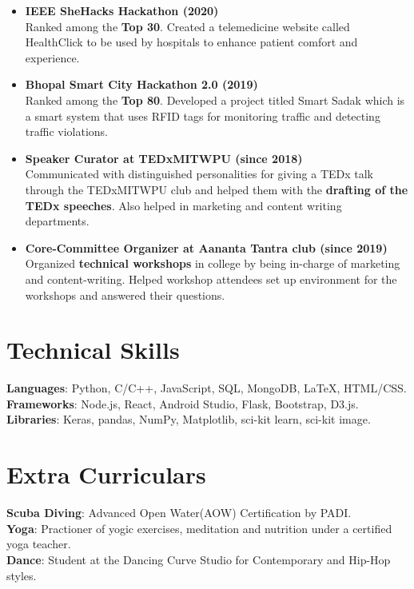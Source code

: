 \documentclass[letterpaper,11pt]{article}
\newcommand{\resumeItem}[1]{
  \item\small{
    {#1 \vspace{-2pt}}
  }
}
\newcommand{\resumeItemListStart}{\begin{itemize}}
\newcommand{\resumeItemListEnd}{\end{itemize}\vspace{-5pt}}
\begin{document}
\medskip
    \resumeItemListStart
        \resumeItem{\textbf{IEEE SheHacks Hackathon (2020)}
        \\Ranked among the \textbf{Top 30}. Created a telemedicine website called HealthClick to be used by hospitals to enhance patient comfort and experience.}
        \resumeItem{\textbf{Bhopal Smart City Hackathon 2.0 (2019)}
        \\Ranked among the \textbf{Top 80}. Developed a project titled Smart Sadak which is a smart system that uses RFID tags for monitoring traffic and detecting traffic violations.}
        \resumeItem{\textbf{Speaker Curator at TEDxMITWPU (since 2018)}
        \\Communicated with distinguished personalities for giving a TEDx talk through the TEDxMITWPU club and helped them with the \textbf{drafting of the TEDx speeches}. Also helped in marketing and content writing departments.}
        \resumeItem{\textbf{Core-Committee Organizer at Aananta Tantra club (since 2019)}
        \\Organized \textbf{technical workshops} in college by being in-charge of marketing and content-writing. Helped workshop attendees set up environment for the workshops and answered their questions.}
    \resumeItemListEnd




\section{Technical Skills}
\smallskip
 \begin{itemize}[leftmargin=0.15in, label={}]
    \small{\item{
     \textbf{Languages}{: Python, C/C++, JavaScript, SQL, MongoDB, LaTeX, HTML/CSS.} \\
     \textbf{Frameworks}{: Node.js, React, Android Studio, Flask, Bootstrap, D3.js.} \\
     \textbf{Libraries}{: Keras, pandas, NumPy, Matplotlib, sci-kit learn, sci-kit image.}
    }}
 \end{itemize}

\section{Extra Curriculars}
\smallskip
\begin{itemize}[leftmargin=0.15in, label={}]
    \small{\item{
     \textbf{Scuba Diving}{: Advanced Open Water(AOW) Certification by PADI.} \\
     \textbf{Yoga}{: Practioner of yogic exercises, meditation and nutrition under a certified yoga teacher.} \\
     \textbf{Dance}{: Student at the Dancing Curve Studio for Contemporary and Hip-Hop styles.}
    }}
 \end{itemize}

\end{document}
